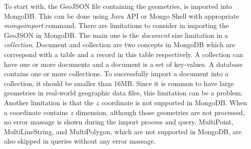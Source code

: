 \documentclass[a4paper,12pt]{article}
\begin{document}
To start with, the GeoJSON file containing the geometries, is imported into MongoDB. This can be done  using Java API or Mongo Shell with appropriate \textit{mongoimport} command. There are limitations to consider in importing the GeoJSON in MongoDB. The main one is the \textit{document} size limitation in a \textit{collection}. Document and collection are two concepts in MongoDB which are correspond with a table and a record in this table respectively. A collection can have one or more documents and a document is a set of key-values. A database contains one or more collections. To successfully import a document into a collection, it should be smaller than 16MB. Since it is common to have large geometries in real-world geographic data files, this limitation can be a problem. Another limitation is that the $z$ coordinate is not supported in MongoDB. When a coordinate contains $z$ dimension, although those geometries are not processed, no error massage is shown during the import process and query. MultiPoint, MultiLineString, and MultiPolygon, which are not supported in MongoDB, are also skipped in queries without any error massage. 
\end{document}
